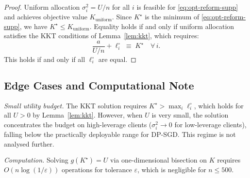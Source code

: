 \documentclass[letterpaper,journal]{IEEEtran}
\begin{document}
\begin{proof}
Uniform allocation $\sigma_i^2 = U/n$ for all $i$ is feasible
for \eqref{eq:opt-reform-supp} and achieves objective value
$K_{\mathrm{uniform}}$. Since $K^\star$ is the minimum of
\eqref{eq:opt-reform-supp}, we have $K^\star \leq
K_{\mathrm{uniform}}$. Equality holds if and only if uniform allocation satisfies the
KKT conditions of Lemma~\ref{lem:kkt}, which requires:
\[
\frac{a}{U/n} + \ell_i^\circ \;\equiv\; K^\star
\quad \forall\, i.
\]
This holds if and only if all $\ell_i^\circ$ are equal.
\end{proof}

\subsection{Edge Cases and Computational Note}

\noindent\textit{Small utility budget.} The KKT solution
requires $K^\star > \max_i \ell_i^\circ$, which holds for all
$U > 0$ by Lemma~\ref{lem:kkt}. However, when $U$ is very
small, the solution concentrates the budget on high-leverage
clients ($\sigma_i^2 \to 0$ for low-leverage clients), falling
below the practically deployable range for DP-SGD. This regime
is not analysed further.

\medskip
\noindent\textit{Computation.} Solving $g(K^\star) = U$ via
one-dimensional bisection on $K$ requires
$O(n \log(1/\varepsilon))$ operations for tolerance
$\varepsilon$, which is negligible for $n \leq 500$.
\end{document}
